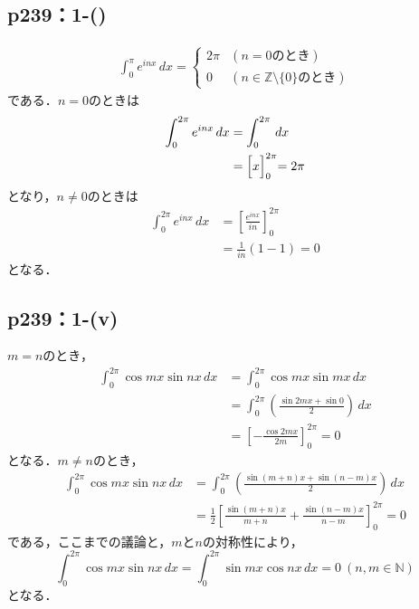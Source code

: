 \subsection*{p239：1-()}
\begin{tanswer}
    \begin{align*}
        \int_{0}^{\pi} e^{inx} \, dx  =
        \begin{cases}
            2 \pi & (n=0 のとき)                             \\
            0     & (n \in \mathbb{Z}\setminus \{0\} のとき)
        \end{cases}
    \end{align*}
    である．$n=0$のときは
    \begin{align*}
        \int_{0}^{2 \pi} e^{inx} \, dx & = \int_{0}^{2\pi} \, dx           \\
                                       & = \Bigl[x\Bigl]_{0}^{2\pi} = 2\pi
    \end{align*}
    となり，$n \ne 0$のときは
    \begin{align*}
        \int_{0}^{2\pi} e^{inx} \, dx & = \left [\frac{e^{inx}}{in} \right ]_{0}^{2\pi} \\
                                      & = \frac{1}{in} (1-1)=0
    \end{align*}
    となる．
\end{tanswer}


\subsection*{p239：1-(v)}

\begin{tanswer}
    $m=n$のとき，
    \begin{align*}
        \int_{0}^{2\pi} \cos m x \sin nx \, dx & = \int_{0}^{2\pi} \cos mx \sin mx \, dx                            \\
                                               & = \int_{0}^{2\pi} \left (\frac{\sin 2mx + \sin 0}{2}\right ) \, dx \\
                                               & = \left [-\frac{\cos 2mx}{2m}\right ]_{0}^{2\pi} =0
    \end{align*}
    となる．$m \ne n$のとき，
    \begin{align*}
        \int_{0}^{2\pi} \cos mx \sin nx \, dx & = \int_{0}^{2\pi} \left (\frac{\sin (m+n)x + \sin (n-m)x}{2}\right) \, dx                 \\
                                              & = \frac{1}{2}\left [\frac{\sin (m+n)x}{m+n}+\frac{\sin (n-m)x}{n-m} \right]_{0}^{2\pi} =0
    \end{align*}
    である，ここまでの議論と，$m$と$n$の対称性により，
    \[
        \int_{0}^{2\pi} \cos mx \sin nx \, dx =\int_{0}^{2\pi} \sin mx \cos nx \, dx =0 ~(n,m \in \mathbb{N})
    \]
    となる．
\end{tanswer}


